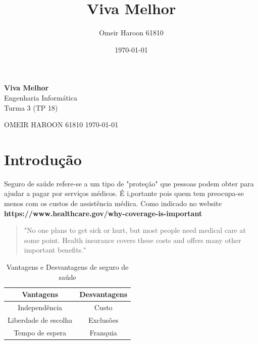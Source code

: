 \documentclass[10pt,a4paper]{article}
\title{Viva Melhor}
\author{Omeir Haroon 61810}
\date{\today}
\begin{document}
\begin{titlepage}
	\begin{center}
	{\Huge\bfseries Viva Melhor}\\
	\vspace{1cm}
	{\Large Engenharia Informática}\\
	\vspace{1cm}
	{\Large Turma 3 (TP 18)}\\
	\end{center}
	\begin{flushright}
	{\Large OMEIR HAROON \Large 61810 \hfill  \large\today}
	\end{flushright}
	\begin{figure}[h]
	\begin{center}
	\end{center}
	\end{figure}
\end{titlepage}


\section{Introdução}
	Seguro de saúde refere-se a um tipo de "proteção"
que pessoas podem obter para ajudar a pagar por serviços médicos. É i,portante pois quem tem preocupa-se menos com os custos de assistência médica.
Como indicado no website {\bfseries https://www.healthcare.gov/why-coverage-is-important}
\begin{quotation}
"No one plans to get sick or hurt, but most people need medical care at some point. Health insurance covers these costs and offers many other important benefits."
\end{quotation}
\begin{table}[h]
	\centering
	\caption{Vantagens e Desvantagens de seguro de saúde}
	\begin{tabular}{|c|c|} 
	\hline
	{\bfseries Vantagens} & {\bfseries Desvantagens}\\
	\hline
	Independência &  Custo\\
	\hline	
	Liberdade de escolha & Exclusões\\
	\hline	
	Tempo de espera  & Franquia\\
	\hline
	
	
	\end{tabular}
\end{table}
\newpage
\end{document}

